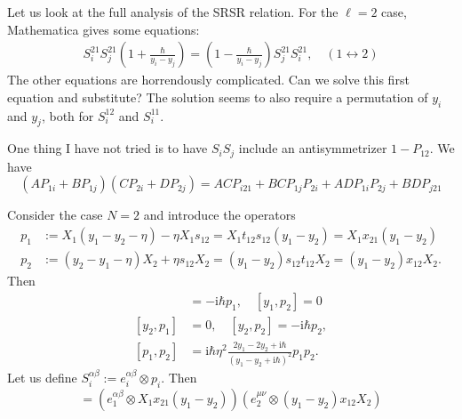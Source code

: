 \documentclass[11pt]{report}
\theoremstyle{definition}
\theoremstyle{remark}
\theoremstyle{remark}
\newcommand{\I}{\mathrm{i}}
\begin{document}
Let us look at the full analysis of the SRSR relation. For the $\ell=2$ case, Mathematica gives some equations:
\begin{align*}
S_i^{21} S_j^{21} (1+\frac{\hbar}{y_i-y_j}) = (1-\frac{\hbar}{y_i-y_j}) S_j^{21} S_i^{21}, \quad (1 \leftrightarrow 2)
\end{align*}
The other equations are horrendously complicated. Can we solve this first equation and substitute? The solution seems to also require a permutation of $y_i$ and $y_j$, both for $S_i^{12}$ and $S_i^{11}$.

One thing I have not tried is to have $S_i S_j$ include an antisymmetrizer $1-P_{12}$. We have
\begin{equation*}
(A P_{1i}+B P_{1j}) (C P_{2i}+D P_{2j}) = AC P_{i21} + BC P_{1j} P_{2i} + AD P_{1i} P_{2j} + BD P_{j21}
\end{equation*}

Consider the case $N=2$ and introduce the operators
\begin{align*}
p_1 &:= X_1 (y_1-y_2-\eta) - \eta X_1 s_{12} = X_1 t_{12} s_{12} (y_1-y_2) = X_1 x_{21} (y_1-y_2) \\
p_2 &:= (y_2-y_1-\eta) X_2 + \eta s_{12} X_2 = (y_1-y_2) s_{12} t_{12} X_2 = (y_1-y_2) x_{12} X_2.
\end{align*}
Then
\begin{align*}
[y_1,p_1] &= -\I\hbar p_1, \quad [y_1,p_2] = 0 \\
[y_2,p_1] &= 0, \quad [y_2,p_2] = -\I\hbar p_2, \\
[p_1,p_2] &= \I \hbar \eta^2 \frac{2 y_1 - 2 y_2 + \I\hbar}{(y_1-y_2+\I\hbar)^2} p_1 p_2.
\end{align*}
Let us define $S_i^{\alpha\beta} := e_i^{\alpha\beta} \otimes p_i$. Then
\begin{equation*}
[S_1^{\alpha\beta},S_2^{\mu\nu}] = (e_1^{\alpha\beta} \otimes X_1 x_{21} (y_1-y_2)) (e_2^{\mu\nu} \otimes (y_1-y_2)x_{12} X_2)
\end{equation*}
\end{document}
